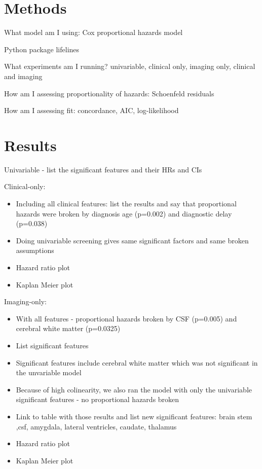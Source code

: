 \section{Methods}

What model am I using: Cox proportional hazards model

Python package lifelines

What experiments am I running? univariable, clinical only, imaging only, clinical and imaging

How am I assessing proportionality of hazards: Schoenfeld residuals

How am I assessing fit: concordance, AIC, log-likelihood

\section{Results}



Univariable
- list the significant features and their HRs and CIs

Clinical-only:
\begin{itemize}
    \item Including all clinical features: list the results and say that proportional hazards were broken by diagnosis age (p=0.002) and diagnostic delay (p=0.038)
    \item Doing univariable screening gives same significant factors and same broken assumptions
    \item Hazard ratio plot
    \item Kaplan Meier plot
\end{itemize}

Imaging-only:
\begin{itemize}
    \item With all features - proportional hazards broken by CSF (p=0.005) and cerebral white matter (p=0.0325)
    \item List significant features
    \item Significant features include cerebral white matter which was not significant in the unvariable model
    \item Because of high colinearity, we also ran the model with only the univariable significant features - no proportional hazards broken
    \item Link to table with those results and list new significant features: brain stem ,csf, amygdala, lateral ventricles, caudate, thalamus
    \item Hazard ratio plot
    \item Kaplan Meier plot
\end{itemize}

